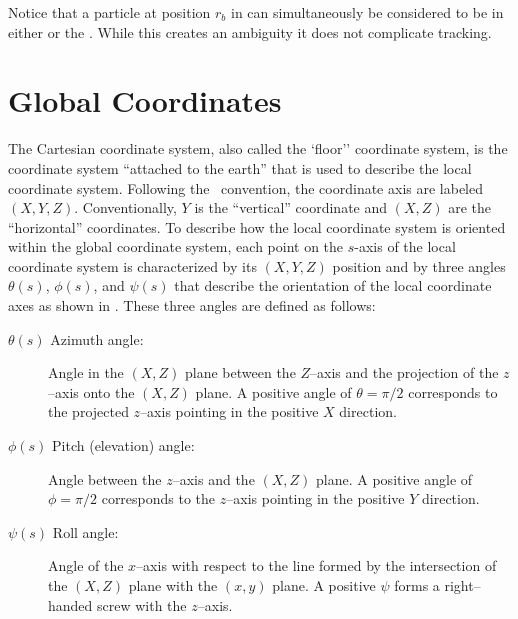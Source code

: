 Notice that a particle at position $r_b$ in  can simultaneously be considered to
be in either  or the . While this creates an ambiguity it does not complicate
tracking.

\section{Global Coordinates}
\label{s:global}

The Cartesian  coordinate system, also called the `floor'' coordinate system, is the
coordinate system ``attached to the earth'' that is used to describe the local coordinate
system. Following the \mad\ convention, the  coordinate axis are labeled $(X, Y,
Z)$. Conventionally, $Y$ is the ``vertical'' coordinate and $(X, Z)$ are the ``horizontal''
coordinates. To describe how the local coordinate system is oriented within the global coordinate
system, each point on the $s$-axis of the local coordinate system is characterized by its $(X, Y,
Z)$ position and by three angles $\theta(s)$, $\phi(s)$, and $\psi(s)$ that describe the orientation
of the local coordinate axes as shown in . These three angles are defined as
follows:
\begin{description}
%
\item[$\theta(s)$ Azimuth angle:] 
Angle in the $(X, Z)$ plane between the $Z$--axis and the projection of the $z$--axis onto the $(X,
Z)$ plane. A positive angle of $\theta = \pi/2$ corresponds to the projected $z$--axis pointing in
the positive $X$ direction.
%
\item[$\phi(s)$ Pitch (elevation) angle:] 
Angle between the $z$--axis and the $(X,Z)$ plane.  A positive angle of $\phi = \pi/2$ corresponds
to the $z$--axis pointing in the positive $Y$ direction.
%
\item[$\psi(s)$ Roll angle:] 
Angle of the $x$--axis with respect to the line formed by the intersection of the $(X, Z)$ plane
with the $(x, y)$ plane. A positive $\psi$ forms a right--handed screw with the $z$--axis.
\end{description}

